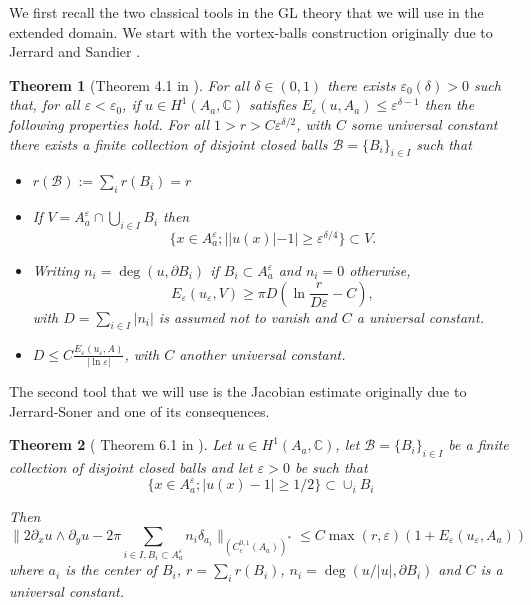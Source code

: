 \documentclass[12pt,reqno]{amsart}
\newtheorem{theorem}{Theorem}[section]
\def\e {{\varepsilon}}
\def \p {\partial}
\numberwithin{equation}{section}
\begin{document}
 We first recall the two classical tools in the GL theory that we will use in the extended domain. We start with the vortex-balls construction originally due to Jerrard \cite{Jerrard_1999} and  Sandier \cite{Sandier_1998}.



\begin{theorem}[Theorem 4.1 in \cite{Sandier_Serfaty_2007}]\label{th:vortex_ball_construction}
For all \(\delta \in (0,1)\) there exists \(\e_0(\delta)>0\) such that, for all \(\e<\e_0\), if \(u\in H^1(A_a,\mathbb{C})\) satisfies \(E_\e(u,A_a) \leq  \e^{\delta-1}\) then the following properties hold.  For all \(1>r>C\e^{\delta/2}\), with \(C\) some universal constant there exists a finite collection of disjoint closed balls \(\mathcal{B}=\{B_i\}_{i\in I}\) such that
\begin{itemize}
\item[1)] \(r(\mathcal{B}):=\sum_i r(B_i)=r\)
\item[2)] If \(V=A_a^\e\cap \bigcup_{i\in I} B_i\) then
\[\{x\in A_a^\e; ||u(x)|-1| \geq \e^{\delta/4}\}\subset V.\]
\item[3)] Writing \(n_i=\deg (u,\p B_i)\) if \(B_i \subset A_a^\e\) and \(n_i=0\) otherwise,
\[ E_\e(u_\e,V)\geq \pi D\left( \ln \frac{r}{D \e}-C \right),\]
with \(D=\sum_{i\in I} |n_i|\) is assumed not to vanish and \(C\) a universal constant.
\item[4)] \(D\leq C \frac{E_\e(u_\e,A)}{|\ln \e|}\), with \(C\) another universal constant.
\end{itemize}
\end{theorem}

The second tool that we will use is the Jacobian estimate originally due to Jerrard-Soner \cite{Jerrard_Soner_2002_Calvar} and one of its consequences.

\begin{theorem}[ Theorem 6.1 in \cite{Sandier_Serfaty_2007}]\label{th:jacobian_estimate}
Let \(u\in H^1(A_a,\mathbb{C})\), let \(\mathcal{B}=\{B_i\}_{i\in I}\) be a finite collection of disjoint closed balls and let \(\e>0\) be such that
\[ \{x\in A_a^\e; |u(x)-1|\geq 1/2\} \subset \cup_i B_i \]

Then \[ \| 2\p_x u \wedge \p_y u -2\pi \sum_{i\in I, B_i\subset A_a^\e} n_i \delta_{a_i}\|_{(C_c^{0,1}(A_a))^*}\leq C \max (r,\e)(1+E_\e(u_\e,A_a))\]
where \(a_i\) is the center of \(B_i\), \(r=\sum_ir(B_i)\), \(n_i=\deg (u/|u|, \p B_i)\) and \(C\) is a universal constant.
\end{theorem}
\end{document}

